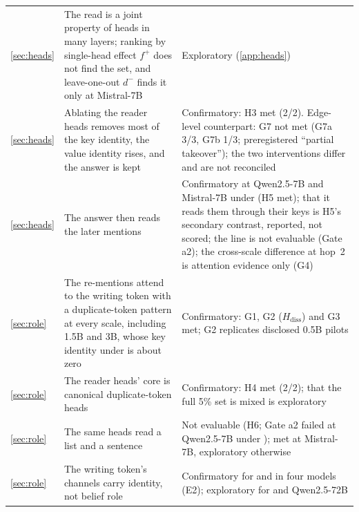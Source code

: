 \begin{table}[p]
\begin{tabular}{p{}p{}p{}}
\cref{sec:heads} & The read is a joint property of heads in many layers; ranking by single-head effect $f^+$ does not find the set, and leave-one-out $d^-$ finds it only at Mistral-7B & Exploratory (\cref{app:heads}) \\
\cref{sec:heads} & Ablating the reader heads removes most of the key identity, the value identity rises, and the answer is kept & Confirmatory: H3 met (2/2). Edge-level counterpart: G7 not met (G7a 3/3, G7b 1/3; preregistered ``partial takeover''); the two interventions differ and are not reconciled \\
\cref{sec:heads} & The answer then reads the later mentions & Confirmatory at Qwen2.5-7B and Mistral-7B under \fmtOpt{} (H5 met); that it reads them through their keys is H5's secondary contrast, reported, not scored; the \fmtPost{} line is not evaluable (Gate a2); the cross-scale difference at hop~2 is attention evidence only (G4) \\
\cref{sec:role} & The re-mentions attend to the writing token with a duplicate-token pattern at every scale, including 1.5B and 3B, whose key identity under \fmtPost{} is about zero & Confirmatory: G1, G2 ($H_{\mathrm{diss}}$) and G3 met; G2 replicates disclosed 0.5B pilots \\
\cref{sec:role} & The reader heads' core is canonical duplicate-token heads & Confirmatory: H4 met (2/2); that the full 5\% set is mixed is exploratory \\
\cref{sec:role} & The same heads read a list and a sentence & Not evaluable (H6; Gate a2 failed at Qwen2.5-7B under \fmtPost{}); met at Mistral-7B, exploratory otherwise \\
\cref{sec:role} & The writing token's channels carry identity, not belief role & Confirmatory for \fmtOpt{} and \fmtNone{} in four models (E2); exploratory for \fmtLetter{} and Qwen2.5-72B \\
\bottomrule
\end{tabular}
\end{table}

